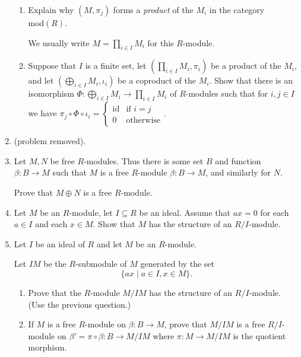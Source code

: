 \documentclass{article}
\begin{document}
\begin{enumerate}
\begin{enumerate}[label=\alph*.]
    \item Explain why $(M, \pi_j)$ forms a \emph{product} of the $M_i$ in the category $\text{mod}(R)$.

    We usually write $M = \prod_{i \in I} M_i$ for this $R$-module.

    \item Suppose that $I$ is a finite set, let $(\prod_{i \in I} M_i, \pi_i)$ be a product of the $M_i$, and let $(\bigoplus_{i \in I} M_i, \iota_i)$ be a coproduct of the $M_i$. Show that there is an isomorphism $\Phi:\bigoplus_{i \in I} M_i \to \prod_{i \in I} M_i$ of $R$-modules such that for $i,j \in I$ we have $\pi_j \circ \Phi \circ \iota_i = \begin{cases} \text{id} & \text{if } i = j \\ 0 & \text{otherwise} \end{cases}$.
\end{enumerate}

\item (problem removed).

\item
Let $M,N$ be free $R$-modules. Thus there is some set $B$ and function $\beta:B \to M$ such that $M$ is a free $R$-module $\beta:B \to M$, and similarly for $N$.

Prove that $M \oplus N$ is a free $R$-module.

\item 
Let $M$ be an $R$-module, let $I \subseteq R$ be an ideal. Assume that $ax = 0$ for each $a \in I$ and each $x \in M$. Show that $M$ has the structure of an $R/I$-module.

\item
Let $I$ be an ideal of $R$ and let $M$ be an $R$-module.

Let $IM$ be the $R$-submodule of $M$ generated by the set 
$$\{ ax \mid a \in I, x \in M \}.$$

\begin{enumerate}[label=\alph*.]
    \item Prove that the $R$-module $M/IM$ has the structure of an $R/I$-module. (Use the previous question.)

    \item If $M$ is a free $R$-module on $\beta:B \to M$, prove that $M/IM$ is a free $R/I$-module on $\beta' = \pi \circ \beta:B \to M/IM$ where $\pi:M \to M/IM$ is the quotient morphism.
\end{enumerate}

\end{enumerate}
\end{document}
